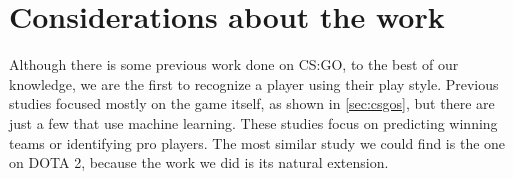 
\section{\label{sec:con}Considerations about the work}

	Although there is some previous work done on CS:GO, to the best of our knowledge, we are the first to recognize a player using their play style. 
	Previous studies focused mostly on the game itself, as shown in \ref{sec:csgos}, but there are just a few that use machine learning. 
	These studies focus on predicting winning teams or identifying pro players. 
	The most similar study we could find is the one on DOTA 2, because the work we did is its natural extension.
